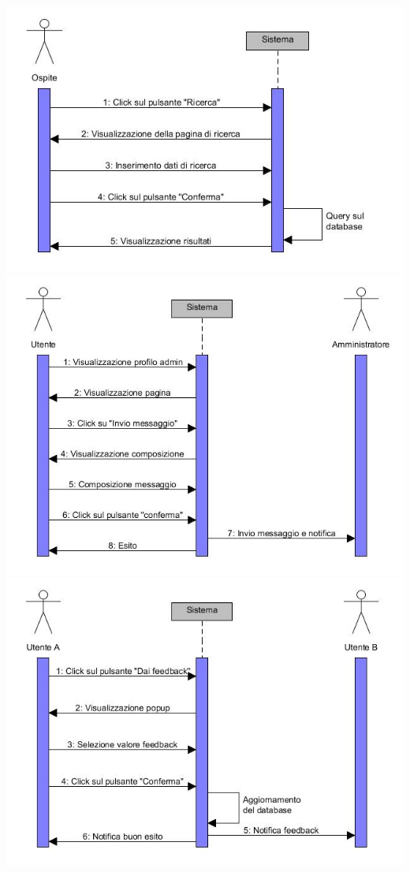 \documentclass[a4paper,12pt]{article}
\begin{document}
\begin{center}
\clearpage
\includegraphics[scale=0.75]{sDiagrams/ricercaUtenti.jpg} \\
\vspace*{\fill}
\includegraphics[scale=0.75]{sDiagrams/invioMessaggio.jpg} \\
\clearpage
\includegraphics[scale=0.75]{sDiagrams/invioFeedback.jpg} \\

\end{center}
\end{document}
